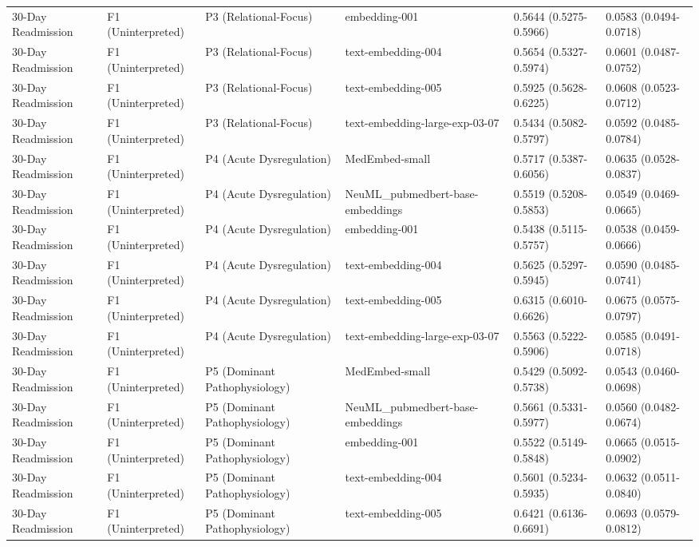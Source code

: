 \begin{tabular}{llllll}
30-Day Readmission & F1 (Uninterpreted) & P3 (Relational-Focus) & embedding-001 & 0.5644 (0.5275-0.5966) & 0.0583 (0.0494-0.0718) \\
30-Day Readmission & F1 (Uninterpreted) & P3 (Relational-Focus) & text-embedding-004 & 0.5654 (0.5327-0.5974) & 0.0601 (0.0487-0.0752) \\
30-Day Readmission & F1 (Uninterpreted) & P3 (Relational-Focus) & text-embedding-005 & 0.5925 (0.5628-0.6225) & 0.0608 (0.0523-0.0712) \\
30-Day Readmission & F1 (Uninterpreted) & P3 (Relational-Focus) & text-embedding-large-exp-03-07 & 0.5434 (0.5082-0.5797) & 0.0592 (0.0485-0.0784) \\
30-Day Readmission & F1 (Uninterpreted) & P4 (Acute Dysregulation) & MedEmbed-small & 0.5717 (0.5387-0.6056) & 0.0635 (0.0528-0.0837) \\
30-Day Readmission & F1 (Uninterpreted) & P4 (Acute Dysregulation) & NeuML\_pubmedbert-base-embeddings & 0.5519 (0.5208-0.5853) & 0.0549 (0.0469-0.0665) \\
30-Day Readmission & F1 (Uninterpreted) & P4 (Acute Dysregulation) & embedding-001 & 0.5438 (0.5115-0.5757) & 0.0538 (0.0459-0.0666) \\
30-Day Readmission & F1 (Uninterpreted) & P4 (Acute Dysregulation) & text-embedding-004 & 0.5625 (0.5297-0.5945) & 0.0590 (0.0485-0.0741) \\
30-Day Readmission & F1 (Uninterpreted) & P4 (Acute Dysregulation) & text-embedding-005 & 0.6315 (0.6010-0.6626) & 0.0675 (0.0575-0.0797) \\
30-Day Readmission & F1 (Uninterpreted) & P4 (Acute Dysregulation) & text-embedding-large-exp-03-07 & 0.5563 (0.5222-0.5906) & 0.0585 (0.0491-0.0718) \\
30-Day Readmission & F1 (Uninterpreted) & P5 (Dominant Pathophysiology) & MedEmbed-small & 0.5429 (0.5092-0.5738) & 0.0543 (0.0460-0.0698) \\
30-Day Readmission & F1 (Uninterpreted) & P5 (Dominant Pathophysiology) & NeuML\_pubmedbert-base-embeddings & 0.5661 (0.5331-0.5977) & 0.0560 (0.0482-0.0674) \\
30-Day Readmission & F1 (Uninterpreted) & P5 (Dominant Pathophysiology) & embedding-001 & 0.5522 (0.5149-0.5848) & 0.0665 (0.0515-0.0902) \\
30-Day Readmission & F1 (Uninterpreted) & P5 (Dominant Pathophysiology) & text-embedding-004 & 0.5601 (0.5234-0.5935) & 0.0632 (0.0511-0.0840) \\
30-Day Readmission & F1 (Uninterpreted) & P5 (Dominant Pathophysiology) & text-embedding-005 & 0.6421 (0.6136-0.6691) & 0.0693 (0.0579-0.0812) \\

\end{tabular}
